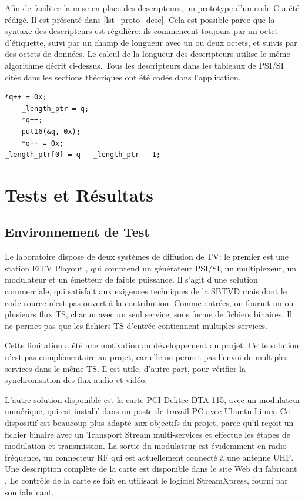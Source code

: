 \documentclass[12pt,a4paper]{article}
\begin{document}
Afin de faciliter la mise en place des descripteurs, un prototype d'un code C a été rédigé. Il est présenté dans \autoref{lst_proto_desc}. Cela est possible parce que la syntaxe des descripteurs est régulière: ils commencent toujours par un octet d'étiquette, suivi par un champ de longueur avec un ou deux octets, et suivis par des octets de données. Le calcul de la longueur des descripteurs utilise le même algorithme décrit ci-dessus. Tous les descripteurs dans les tableaux de PSI/SI cités dans les sections théoriques ont été codés dans l'application.

\begin{minipage}{\linewidth}
\begin{lstlisting}[caption={Prototype d'un descripteur.}, label={lst_proto_desc}]
	*q++ = 0x;
	_length_ptr = q;
	*q++;
	put16(&q, 0x);
	*q++ = 0x; 
_length_ptr[0] = q - _length_ptr - 1;
\end{lstlisting}
\end{minipage}

\section{Tests et Résultats}

\subsection{Environnement de Test}

Le laboratoire dispose de deux systèmes de diffusion de TV: le premier est une station EiTV Playout \cite{eitv}, qui comprend un générateur PSI/SI, un multiplexeur, un modulateur et un émetteur de faible puissance. Il s'agit d'une solution commerciale, qui satisfait aux exigences techniques de la SBTVD mais dont le code source n'est pas ouvert à la contribution. Comme entrées, on fournit un ou plusieurs flux TS, chacun avec un seul service, sous forme de fichiers binaires. Il ne permet pas que les fichiers TS d'entrée contiennent multiples services.

Cette limitation a été une motivation au développement du projet. Cette solution n'est pas complémentaire au projet, car elle ne permet pas l'envoi de multiples services dans le même TS. Il est utile, d'autre part, pour vérifier la synchronisation des flux audio et vidéo.

L'autre solution disponible est la carte PCI Dektec DTA-115, avec un modulateur numérique, qui est installé dans un poste de travail PC avec Ubuntu Linux. Ce dispositif est beaucoup plus adapté aux objectifs du projet, parce qu'il reçoit un fichier binaire avec un Transport Stream multi-services et effectue les étapes de modulation et transmission. La sortie du modulateur est évidemment en radio-fréquence, un connecteur RF qui est actuellement connecté à une antenne UHF. Une description complète de la carte est disponible dans le site Web du fabricant \cite{dektec}. Le contrôle de la carte se fait en utilisant le logiciel StreamXpress, fourni par son fabricant.
\end{document}
